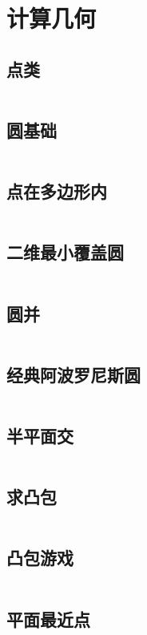 \chapter{计算几何}
\section{点类}
\inputminted{cpp}{\source/computational-geometry/point.cpp}
\section{圆基础}
\inputminted{cpp}{\source/computational-geometry/circle.cpp}
\section{点在多边形内}
\inputminted{cpp}{\source/computational-geometry/point-in-polygon.cpp}
\section{二维最小覆盖圆}
\inputminted{cpp}{\source/computational-geometry/mincir.cpp}
\section{圆并}
\inputminted{cpp}{\source/computational-geometry/circle_union.cpp}
\section{经典阿波罗尼斯圆}
\inputminted{cpp}{\source/computational-geometry/Apollonius_Circle.cpp}
\section{半平面交}
\inputminted{cpp}{\source/computational-geometry/halfplaneintersection.cpp}
\section{求凸包}
\inputminted{cpp}{\source/computational-geometry/convex-hull.cpp}
\section{凸包游戏}
\inputminted{cpp}{\source/computational-geometry/PlayWithConvex.cpp}
\section{平面最近点}
\inputminted{cpp}{\source/computational-geometry/closest-pair-of-points.cpp}
